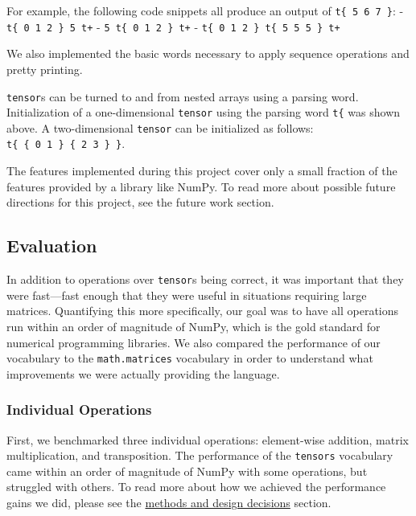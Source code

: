 \documentclass[
]{article}
\begin{document}
For example, the following code snippets all produce an output of
\texttt{t\{\ 5\ 6\ 7\ \}}: - \texttt{t\{\ 0\ 1\ 2\ \}\ 5\ t+} -
\texttt{5\ t\{\ 0\ 1\ 2\ \}\ t+} -
\texttt{t\{\ 0\ 1\ 2\ \}\ t\{\ 5\ 5\ 5\ \}\ t+}

We also implemented the basic words necessary to apply sequence
operations and pretty printing.

\texttt{tensor}s can be turned to and from nested arrays using a parsing
word. Initialization of a one-dimensional \texttt{tensor} using the
parsing word \texttt{t\{} was shown above. A two-dimensional
\texttt{tensor} can be initialized as follows:
\texttt{t\{\ \{\ 0\ 1\ \}\ \{\ 2\ 3\ \}\ \}}.

The features implemented during this project cover only a small fraction
of the features provided by a library like NumPy. To read more about
possible future directions for this project, see the future work
section.

\hypertarget{evaluation}{%
\subsection{Evaluation}\label{evaluation}}

In addition to operations over \texttt{tensor}s being correct, it was
important that they were fast---fast enough that they were useful in
situations requiring large matrices. Quantifying this more specifically,
our goal was to have all operations run within an order of magnitude of
NumPy, which is the gold standard for numerical programming libraries.
We also compared the performance of our vocabulary to the
\texttt{math.matrices} vocabulary in order to understand what
improvements we were actually providing the language.

\hypertarget{individual-operations}{%
\subsubsection{Individual Operations}\label{individual-operations}}

First, we benchmarked three individual operations: element-wise
addition, matrix multiplication, and transposition. The performance of
the \texttt{tensors} vocabulary came within an order of magnitude of
NumPy with some operations, but struggled with others. To read more
about how we achieved the performance gains we did, please see the
\href{methods.md}{methods and design decisions} section.
\end{document}
